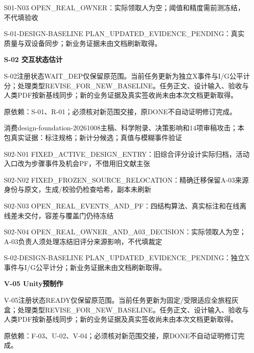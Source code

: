 \documentclass[11pt,a4paper]{article}
\newcommand{\reviewsection}[1]{\par\Needspace{5\baselineskip}\vspace{10pt}\begin{center}{\titlelatin\titlecjk\bfseries\fontsize{14}{20}\selectfont #1}\end{center}}
\begin{document}
S01-\allowbreak{}N03 OPEN\_\allowbreak{}REAL\_\allowbreak{}OWNER：实际领取人为空；阈值和精度需前测冻结，不代填验收


S-\allowbreak{}01-\allowbreak{}DESIGN-\allowbreak{}BASELINE PLAN\_\allowbreak{}UPDATED\_\allowbreak{}EVIDENCE\_\allowbreak{}PENDING：真实质量与双设备同步；新业务证据未由文档刷新取得。


\reviewsection{S-\allowbreak{}02 交互状态估计}
S-\allowbreak{}02注册状态WAIT\_\allowbreak{}DEP仅保留原范围。当前任务更新为独立X事件与I/\allowbreak{}G公平计分；处理类型REVISE\_\allowbreak{}FOR\_\allowbreak{}NEW\_\allowbreak{}BASELINE。任务正文、设计输入、验收与人类PDF按新基线同步；新的业务证据及真实签收尚未由本次文档更新取得。


原依赖：S-\allowbreak{}01、R-\allowbreak{}01；必须核对新范围交接，原DONE不自动证明修订完成。


消费design-\allowbreak{}foundation-\allowbreak{}20261008主稿、科学附录、决策影响和14项审稿攻击；本包真实证据：标注规格；新计分候选；真值与模糊事件验证


S02-\allowbreak{}N01 FIXED\_\allowbreak{}ACTIVE\_\allowbreak{}DESIGN\_\allowbreak{}ENTRY：旧综合评分设计实际归档，活动入口改为步骤事件及机会PF，不借用旧文献主张


S02-\allowbreak{}N02 FIXED\_\allowbreak{}FROZEN\_\allowbreak{}SOURCE\_\allowbreak{}RELOCATION：精确迁移保留A-\allowbreak{}03来源身份与原文，生成/\allowbreak{}校验仍检查哈希，副本未刷新


S02-\allowbreak{}N03 OPEN\_\allowbreak{}REAL\_\allowbreak{}EVENTS\_\allowbreak{}AND\_\allowbreak{}PF：四结构算法、真实标注和在线离线差未交付，容差与覆盖门仍待冻结


S02-\allowbreak{}N04 OPEN\_\allowbreak{}REAL\_\allowbreak{}OWNER\_\allowbreak{}AND\_\allowbreak{}A03\_\allowbreak{}DECISION：实际领取人为空；A-\allowbreak{}03负责人须处理冻结旧评分来源影响，不代填裁定


S-\allowbreak{}02-\allowbreak{}DESIGN-\allowbreak{}BASELINE PLAN\_\allowbreak{}UPDATED\_\allowbreak{}EVIDENCE\_\allowbreak{}PENDING：独立X事件与I/\allowbreak{}G公平计分；新业务证据未由文档刷新取得。


\reviewsection{V-\allowbreak{}05 Unity预制作}
V-\allowbreak{}05注册状态READY仅保留原范围。当前任务更新为固定/\allowbreak{}受限适应全旅程灰盒；处理类型REVISE\_\allowbreak{}FOR\_\allowbreak{}NEW\_\allowbreak{}BASELINE。任务正文、设计输入、验收与人类PDF按新基线同步；新的业务证据及真实签收尚未由本次文档更新取得。


原依赖：F-\allowbreak{}03、U-\allowbreak{}02、V-\allowbreak{}04；必须核对新范围交接，原DONE不自动证明修订完成。
\end{document}
